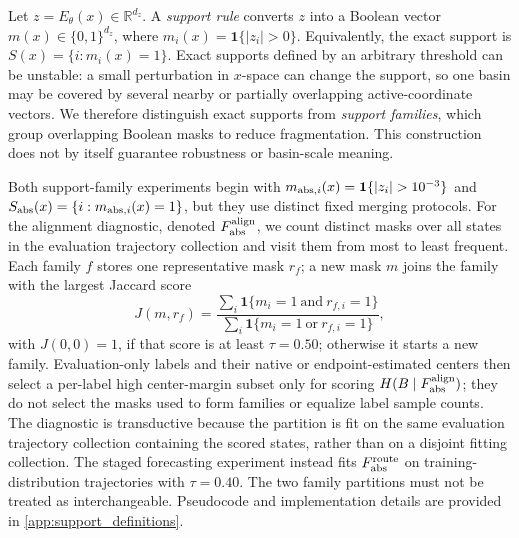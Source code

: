 \documentclass[11pt]{article}
\newcommand{\Enc}{E_\theta}
\begin{document}
Let \(z=\Enc(x)\in\mathbb{R}^{d_z}\). A \textit{support rule} converts \(z\) into a Boolean vector \(m(x)\in\{0,1\}^{d_z}\), where \(m_i(x)=\mathbf 1\{|z_i|>0\}\). Equivalently, the exact support is \(S(x)=\{i:m_i(x)=1\}\).
Exact supports defined by an arbitrary threshold can be unstable: a small perturbation in $x$-space can change the support, so one basin may be covered by several nearby or partially overlapping active-coordinate vectors.
We therefore distinguish exact supports from \emph{support families}, which group overlapping Boolean masks to reduce fragmentation. This construction does not by itself guarantee robustness or basin-scale meaning.

Both support-family experiments begin with \(m_{{\rm abs},i}(x)=\mathbf{1}\{|z_i|>10^{-3}\}\) and \(S_{\rm abs}(x)=\{i:m_{{\rm abs},i}(x)=1\}\), but they use distinct fixed merging protocols. For the alignment diagnostic, denoted \(F_{\rm abs}^{\rm align}\), we count distinct masks over all states in the evaluation trajectory collection and visit them from most to least frequent. Each family \(f\) stores one representative mask \(r_f\); a new mask \(m\) joins the family with the largest Jaccard score
\[
  J(m,r_f)=
  \frac{\sum_i \mathbf{1}\{m_i=1\ \text{and}\ r_{f,i}=1\}}
       {\sum_i \mathbf{1}\{m_i=1\ \text{or}\ r_{f,i}=1\}},
\]
with \(J(0,0)=1\), if that score is at least \(\tau=0.50\); otherwise it starts a new family. Evaluation-only labels and their native or endpoint-estimated centers then select a per-label high center-margin subset only for scoring \(H(B\mid F_{\rm abs}^{\rm align})\); they do not select the masks used to form families or equalize label sample counts. The diagnostic is transductive because the partition is fit on the same evaluation trajectory collection containing the scored states, rather than on a disjoint fitting collection. The staged forecasting experiment instead fits \(F_{\rm abs}^{\rm route}\) on training-distribution trajectories with \(\tau=0.40\). The two family partitions must not be treated as interchangeable. Pseudocode and implementation details are provided in \cref{app:support_definitions}.
\end{document}
